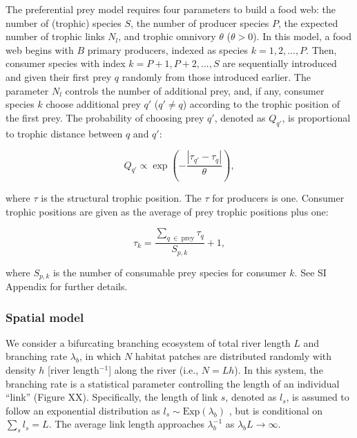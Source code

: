 \documentclass[11pt, class=article, crop=false]{standalone}
\begin{document}
The preferential prey model requires four parameters to build a food web: the number of (trophic) species $S$, the number of producer species $P$, the expected number of trophic links $N_l$, and trophic omnivory $\theta$ ($\theta > 0$).
In this model, a food web begins with $B$ primary producers, indexed as species $k = 1, 2, ..., P$.
Then, consumer species with index $k = P + 1, P + 2, ..., S$ are sequentially introduced and given their first prey $q$ randomly from those introduced earlier.
The parameter $N_l$ controls the number of additional prey, and, if any, consumer species $k$ choose additional prey $q'$ ($q' \ne q$) according to the trophic position of the first prey.
The probability of choosing prey $q'$, denoted as $Q_{q'}$, is proportional to trophic distance between $q$ and $q'$:

\begin{equation}
    Q_{q'} \propto \exp(-\frac{|\tau_{q'} - \tau_q|}{\theta}),
\end{equation}

where $\tau$ is the structural trophic position.
The $\tau$ for producers is one.
Consumer trophic positions are given as the average of prey trophic positions plus one:

\begin{equation}
    \tau_k = \frac{\sum_{q~\in~\text{prey}} \tau_q}{S_{p, k}} + 1,
\end{equation}

where $S_{p,k}$ is the number of consumable prey species for consumer $k$.
See SI Appendix for further details.

\subsubsection{Spatial model}

We consider a bifurcating branching ecosystem of total river length $L$ and branching rate $\lambda_b$, in which $N$ habitat patches are distributed randomly with density $h$ [river length$^{-1}$] along the river (i.e., $N = Lh$).
In this system, the branching rate is a statistical parameter controlling the length of an individual ``link'' (Figure XX).
Specifically, the length of link $s$, denoted as $l_s$, is assumed to follow an exponential distribution as $l_s \sim \mbox{Exp}(\lambda_b)$ \citep{peckham_reformulation_1999, terui_metapopulation_2018, terui_emergent_2021}, but is conditional on $\sum_s l_s = L$.
The average link length approaches $\lambda_b^{-1}$ as $\lambda_b L \rightarrow \infty$.
\end{document}
